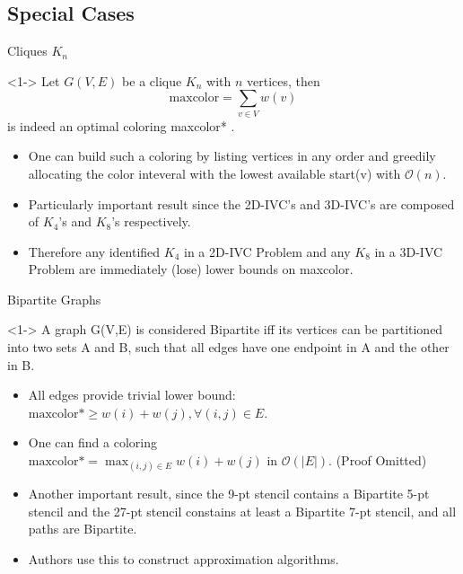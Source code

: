 \subsection{Special Cases}

\begin{frame}{Cliques $K_n$}
  \begin{theorem}<1->
    Let $G(V,E)$ be a clique $K_n$ with $n$ vertices, then  \[ \text{maxcolor}= \sum_{v \in V} w(v) \]
    is indeed an optimal coloring maxcolor* .
  \end{theorem}

  \begin{itemize}
    \item<2-> One can build such a coloring by listing vertices in any order and
    greedily allocating the color inteveral with the lowest available start(v) with $\mathcal{O}(n)$.

    \item<3-> Particularly important result since the 2D-IVC's and 3D-IVC's are composed of $K_4$'s and $K_8$'s
    respectively.

    \item<4-> Therefore any identified $K_4$ in a 2D-IVC Problem and any $K_8$ in a 3D-IVC Problem are immediately
    (lose) lower bounds on maxcolor.
  \end{itemize}
\end{frame}

\begin{frame}{Bipartite Graphs}
  \begin{definition}<1->
    A graph G(V,E) is considered Bipartite iff its vertices can be partitioned into
    two sets A and B, such that all edges have one endpoint in A and the other in B.
  \end{definition}

  \begin{itemize}
    \item<2-> All edges provide trivial lower bound: $ \text{maxcolor*} \ge  w(i) + w(j), \forall (i, j) \in E.$
    \item<3-> One can find a coloring \\ 
    $\text{maxcolor*} = \max_{(i,j) \in E} w(i) + w(j)$ in $\mathcal{O}(|E|)$. (Proof Omitted)
    \item<4-> Another important result, since the 9-pt stencil contains a Bipartite 5-pt stencil and the
    27-pt stencil constains at least a Bipartite 7-pt stencil, and all paths are Bipartite.
    \item<5-> Authors use this to construct approximation algorithms.
  \end{itemize}
\end{frame}

